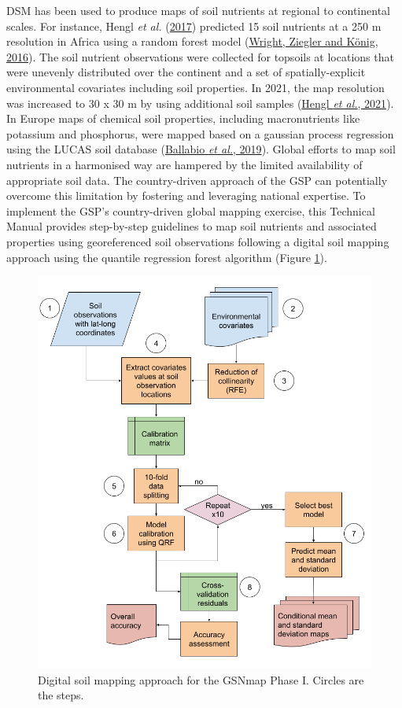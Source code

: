 \documentclass[
  10pt,
  b5paper,
  oneside]{book}
\begin{document}
DSM has been used to produce maps of soil nutrients at regional to continental scales. For instance, Hengl \emph{et al.} (\protect\hyperlink{ref-Hengl2017}{2017}) predicted 15 soil nutrients at a 250 m resolution in Africa using a random forest model (\protect\hyperlink{ref-wright2016}{Wright, Ziegler and König, 2016}). The soil nutrient observations were collected for topsoils at locations that were unevenly distributed over the continent and a set of spatially-explicit environmental covariates including soil properties. In 2021, the map resolution was increased to 30 x 30 m by using additional soil samples (\protect\hyperlink{ref-hengl2021}{Hengl \emph{et al.}, 2021}).
In Europe maps of chemical soil properties, including macronutrients like potassium and phosphorus, were mapped based on a gaussian process regression using the LUCAS soil database (\protect\hyperlink{ref-ballabio2019}{Ballabio \emph{et al.}, 2019}).
Global efforts to map soil nutrients in a harmonised way are hampered by the limited availability of appropriate soil data. The country-driven approach of the GSP can potentially overcome this limitation by fostering and leveraging national expertise. To implement the GSP's country-driven global mapping exercise, this Technical Manual provides step-by-step guidelines to map soil nutrients and associated properties using georeferenced soil observations following a digital soil mapping approach using the quantile regression forest algorithm (Figure \ref{fig:workflow1}).

\begin{figure}
\includegraphics[width=11.36in]{images/workflow_lat_long_data} \caption{Digital soil mapping approach for the GSNmap Phase I. Circles are the steps.}\label{fig:workflow1}
\end{figure}
\end{document}

